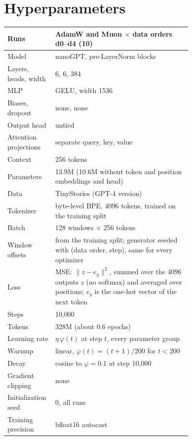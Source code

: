 \section{Hyperparameters}
\label{app:hparams}

\begin{center}\small
\captionsetup{type=table}
\caption{Hyperparameters shared by the AdamW and Muon runs.}
\label{tab:app-shared}
\begin{tabular}{@{}lp{0.74\linewidth}@{}}
\hline
Runs & AdamW and Muon $\times$ data orders d0--d4 (10) \\
\hline
Model & nanoGPT, pre-LayerNorm blocks \\
Layers, heads, width & 6, 6, 384 \\
MLP & GELU, width 1536 \\
Biases, dropout & none, none \\
Output head & untied \\
Attention projections & separate query, key, value \\
Context & 256 tokens \\
Parameters & 13.9M (10.6M without token and position embeddings and head) \\
\hline
Data & TinyStories (GPT-4 version) \\
Tokenizer & byte-level BPE, 4096 tokens, trained on the training split \\
Batch & 128 windows $\times$ 256 tokens \\
Window offsets & from the training split; generator seeded with (data order, step), same for every optimizer \\
\hline
Loss & MSE: $\|z-e_y\|^2$, summed over the 4096 outputs $z$ (no softmax) and averaged over positions; $e_y$ is the
  one-hot vector of the next token \\
Steps & 10{,}000 \\
Tokens & 328M (about 0.6 epochs) \\
Learning rate & $\eta\,\varphi(t)$ at step $t$, every parameter group \\
Warmup & linear, $\varphi(t)=(t+1)/200$ for $t<200$ \\
Decay & cosine to $\varphi=0.1$ at step 10{,}000 \\
Gradient clipping & none \\
\hline
Initialization seed & 0, all runs \\
Training precision & bfloat16 autocast \\

\end{tabular}
\end{center}
